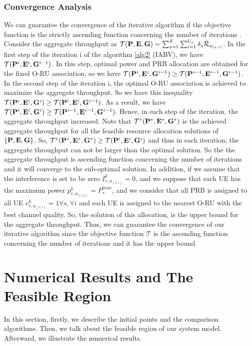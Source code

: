 \documentclass[conference]{IEEEtran}
\begin{document}
\subsubsection{Convergence Analysis}
We can guarantee the convergence of the iterative algorithm if the objective function is the strictly ascending function concerning the number of iterations \cite{gholipoor2020resource}.
Consider the aggregate throughput as $\mathcal{T(\bold{P},\bold{E},\bold{G})} =\sum_{s=1}^{S}\sum_{i=1}^{U_s}\delta_s \bar{\mathcal{R}}_{u_{(s,i)}}$. 
In the first step of the iteration i of the algorithm \ref{alg2} (IABV), we have $\mathcal{T}(\bold{P}^{i},\bold{E}^i,\bold{G}^{i-1})$.
In this step, optimal power and PRB allocation are obtained for the fixed O-RU association, so we have
$\mathcal{T}(\bold{P}^{i},\bold{E}^i,\bold{G}^{i-1}) \geq \mathcal{T}(\bold{P}^{i-1},\bold{E}^{i-1},\bold{G}^{i-1})$.
In the second step of the iteration i, the optimal O-RU association is achieved to maximize the aggregate throughput. So we have this inequality
$\mathcal{T}(\bold{P}^{i},\bold{E}^i,\bold{G}^{i}) \geq \mathcal{T}(\bold{P}^{i},\bold{E}^{i},\bold{G}^{i-1})$.
As a result, we have 
$\mathcal{T}(\bold{P}^{i},\bold{E}^i,\bold{G}^{i}) \geq \mathcal{T}(\bold{P}^{i-1},\bold{E}^{i-1},\bold{G}^{i-1})$.
Hence, in each step of the iteration, the aggregate throughput increased.
Note that $\mathcal{T}^*(\bold{P}^{*},\bold{E}^*,\bold{G}^{*})$ is the achieved aggregate throughput 
for all the feasible resource allocation solutions of $\{\bold{P},\bold{E},\bold{G}\}$.
So, $\mathcal{T}^*(\bold{P}^{*},\bold{E}^*,\bold{G}^{*}) \geq \mathcal{T}(\bold{P}^{i},\bold{E}^i,\bold{G}^{i})$ and thus in each iteration, the aggregate throughput can not be larger than the optimal solution.
So the the aggregate throughput is ascending function concerning the number of iterations and it will converge to the sub-optimal solution.
In addition, if we assume that the interference is set to be zero ${I}_{r,u_{(s,i)}}^{k}=0$,
and we suppose that each UE has the maximum power $p_{r,u_{(s,i)}}^k = P_{s}^{max}$,
and we consider that all PRB is assigned to all UE $e_{r,u_{(s,i)}}^k = 1 \forall s,\forall i$
and each UE is assigned to the nearest O-RU with the best channel quality. So, the solution of this allocation, is the upper bound 
for the aggregate throughput. Thus,
we can guarantee the convergence of our iterative algorithm since the objective function $\mathcal{T}$ is the ascending function concerning the number of iterations
 and it has the upper bound. 
\section{Numerical Results and The Feasible Region}\label{NE}
In this section, firstly, we describe the initial points and the comparison algorithms.
Then, we talk about the feasible region of our system model. Afterward, we illustrate the numerical results.
\end{document}
